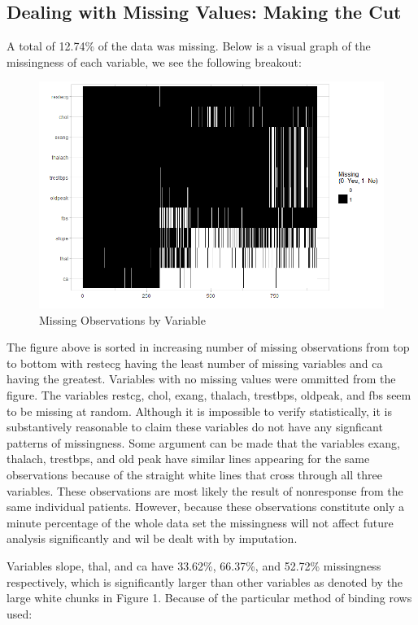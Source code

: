 \documentclass[12pt]{article}
\begin{document}
\subsection{Dealing with Missing Values: Making the Cut}
A total of 12.74\% of the data was missing. Below is a visual graph of the missingness of each variable, we see the following breakout: 
\begin{center}
\begin{figure}[h!]
\includegraphics[width=\linewidth]{PredataMissing}
\caption{Missing Observations by Variable}
\end{figure}
\end{center}
The figure above is sorted in increasing number of missing observations from top to bottom with restecg having the least number of missing variables and ca having the greatest. Variables with no missing values were ommitted from the figure. The variables restcg, chol, exang, thalach, trestbps, oldpeak, and fbs seem to be missing at random. Although it is impossible to verify statistically, it is substantively reasonable to claim these variables do not have any signficant patterns of missingness. Some argument can be made that the variables exang, thalach, trestbps, and old peak have similar lines appearing for the same observations because of the straight white lines that cross through all three variables. These observations are most likely the result of nonresponse from the same individual patients. However, because these observations constitute only a minute percentage of the whole data set the missingness will not affect future analysis significantly and wil be dealt with by imputation. 

  Variables slope, thal, and ca have 33.62\%, 66.37\%, and 52.72\% missingness respectively, which is significantly larger than other variables as denoted by the large white chunks in Figure 1. Because of the particular method of binding rows used: 
  
\end{document}
